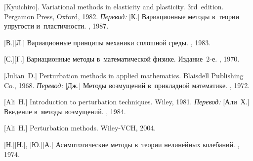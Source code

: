 \begin{thebibliography}{123}
\begin{otherlanguage}{russian}
[Kyuichiro]. Variational methods in elasticity and plasticity. 3rd~edition. Pergamon Press, Oxford, 1982. 
\emph{Перевод:} [К.] Вариационные методы в~теории упругости и~пластичности. \mirpublisher, 1987. 

[В.][Л.] Вариационные принципы механики сплошной среды. \naukapublisher, 1983. 

[С.][Г.] Вариационные методы в~математической физике. Издание~2\hbox{-}е. \naukapublisher, 1970. 

%
%



[Julian~D.] Perturbation methods in applied mathematics. Blaisdell Publishing Co., 1968. 
\emph{Перевод:} [Дж.] Методы возмущений в~прикладной математике. \mirpublisher, 1972. 

[Ali~H.] Introduction to perturbation techniques. Wiley, 1981. 
\emph{Перевод:} [Али~Х.] Введение в~методы возмущений. \mirpublisher, 1984. 

[Ali~H.] Perturbation methods. Wiley-VCH, 2004. 

[Н.][Н.], [Ю.][А.] Асимптотические методы в~теории нелинейных колебаний. \naukapublisher, 1974. 


\end{otherlanguage}
\end{thebibliography}
